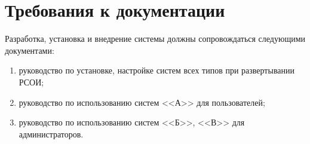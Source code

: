 \section{Требования к документации}
Разработка, установка и внедрение системы должны сопровождаться следующими документами:

\begin{enumerate}
	\item руководство по установке, настройке систем всех типов при развертывании РСОИ;
	\item руководство по использованию систем <<А>> для пользователей;
	\item руководство по использованию систем <<Б>>, <<В>> для администраторов.
\end{enumerate}



